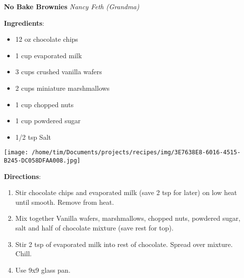 \documentclass[11pt, twoside, openany]{book}
\begin{document}
\noindent\begin{minipage}[t]{\linewidth}%
{\Large\textbf{No Bake Brownies}} \label{no-bake-brownies}\hfill\textit{Nancy Feth (Grandma)}\\
\noindent\begin{minipage}[t]{0.78\linewidth}%
\textbf{Ingredients}:\vspace{-3mm}
\begin{multicols}{2}
\begin{itemize}\setlength\itemsep{-1mm}
\item 12 oz chocolate chips
\item 1 cup evaporated milk
\item 3 cups crushed vanilla wafers
\item 2 cups miniature marshmallows
\item 1 cup chopped nuts
\item 1 cup powdered sugar
\item 1/2 tsp Salt
\end{itemize}
\end{multicols}
\end{minipage}
\noindent\begin{minipage}[t]{0.18\linewidth}
\centering \strut\vspace*{-\baselineskip}\newline
\texttt{[image: /home/tim/Documents/projects/recipes/img/3E7638E8-6016-4515-B245-DC058DFAA008.jpg]}\\
\end{minipage}\vspace{3mm}
\textbf{Directions}:
\vspace{-3mm}\begin{enumerate}\setlength\itemsep{-1mm}
\item Stir chocolate chips and evaporated milk (save 2 tsp for later) on low heat until smooth. Remove from heat.
\item Mix together Vanilla wafers, marshmallows, chopped nuts, powdered sugar, salt and half of chocolate mixture (save rest for top).
\item Stir 2 tsp of evaporated milk into rest of chocolate. Spread over mixture. Chill.
\item Use 9x9 glass pan.
\end{enumerate}
\end{minipage}\vspace{8mm}
\end{document}
